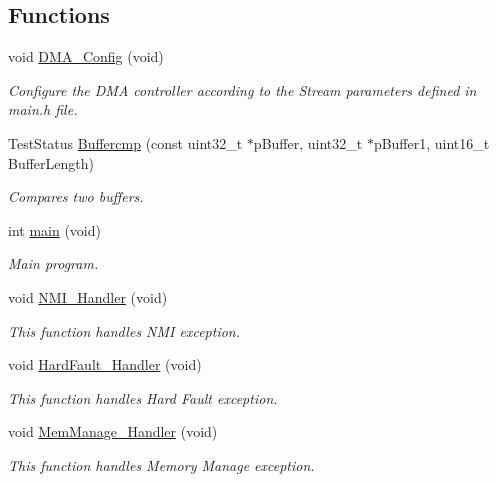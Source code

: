 \subsection*{Functions}
\begin{DoxyCompactItemize}
\item 
void \hyperlink{group___d_m_a___f_l_a_s_h___r_a_m_ga2f35631611ce4b2f324c418ba6ca84a9}{D\-M\-A\-\_\-\-Config} (void)
\begin{DoxyCompactList}\small\item\em Configure the D\-M\-A controller according to the Stream parameters defined in main.\-h file. \end{DoxyCompactList}\item 
Test\-Status \hyperlink{group___d_m_a___f_l_a_s_h___r_a_m_ga34a2d42696369bbd1373e884d48523c5}{Buffercmp} (const uint32\-\_\-t $\ast$p\-Buffer, uint32\-\_\-t $\ast$p\-Buffer1, uint16\-\_\-t Buffer\-Length)
\begin{DoxyCompactList}\small\item\em Compares two buffers. \end{DoxyCompactList}\item 
int \hyperlink{group___d_m_a___f_l_a_s_h___r_a_m_ga840291bc02cba5474a4cb46a9b9566fe}{main} (void)
\begin{DoxyCompactList}\small\item\em Main program. \end{DoxyCompactList}\item 
void \hyperlink{group___d_m_a___f_l_a_s_h___r_a_m_ga6ad7a5e3ee69cb6db6a6b9111ba898bc}{N\-M\-I\-\_\-\-Handler} (void)
\begin{DoxyCompactList}\small\item\em This function handles N\-M\-I exception. \end{DoxyCompactList}\item 
void \hyperlink{group___d_m_a___f_l_a_s_h___r_a_m_ga2bffc10d5bd4106753b7c30e86903bea}{Hard\-Fault\-\_\-\-Handler} (void)
\begin{DoxyCompactList}\small\item\em This function handles Hard Fault exception. \end{DoxyCompactList}\item 
void \hyperlink{group___d_m_a___f_l_a_s_h___r_a_m_ga3150f74512510287a942624aa9b44cc5}{Mem\-Manage\-\_\-\-Handler} (void)
\begin{DoxyCompactList}\small\item\em This function handles Memory Manage exception. \end{DoxyCompactList}\item 

\end{DoxyCompactItemize}
